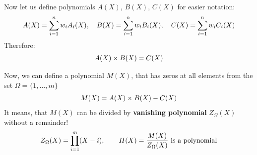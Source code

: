 \documentclass{zkdl-presentation-template}
\begin{document}
    \begin{frame}
        Now let us define polynomials $A(X)$, $B(X)$, $C(X)$ for easier notation: 
        \vspace{-5pt}
        \begin{equation*}
            A(X) = \sum_{i = 1}^{n} w_iA_i(X), \quad B(X) = \sum_{i = 1}^{n} w_iB_i(X), \quad C(X) = \sum_{i = 1}^{n} w_iC_i(X)
            \vspace{-5pt}
        \end{equation*}
        \pause  
        Therefore:
        \vspace{-5pt}
        \begin{equation*}
            A(X) \times B(X) = C(X)
            \vspace{-5pt}
        \end{equation*}

        Now, we can define a polynomial $M(X)$, that has zeros at all elements from the set
        $\Omega = \{1,\dots,m\}$
        \vspace{-5pt}
        \begin{equation*}
            M(X) = A(X) \times B(X) - C(X)
            \vspace{-5pt}
        \end{equation*}
        \pause
        It means, that $M(X)$ can be divided by \textbf{vanishing polynomial} $Z_{\Omega}(X)$ without a remainder!
        \vspace{-8pt}
        \begin{equation*}
            Z_{\Omega}(X) = \prod_{i=1}^m (X - i), \qquad \text{$H(X) = \frac{M(X)}{Z_{\Omega}(X)}$ is a polynomial}
            \vspace{-5pt}
        \end{equation*}
    \end{frame}
\end{document}
